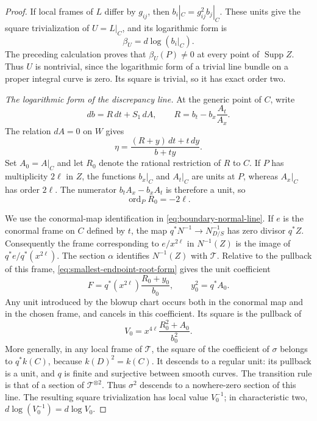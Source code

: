 \begin{proof}
If local frames of $L$ differ by $g_{ij}$, then
$b_i|_C=g_{ij}^2b_j|_C$.  These units give the square trivialization
of $U=L|_C$, and its logarithmic form is
\[
 \beta_U=d\log(b_i|_C).
\]
The preceding calculation proves that $\beta_U(P)\ne0$ at every
point of $\operatorname{Supp}Z$.  Thus $U$ is nontrivial, since the
logarithmic form of a trivial line bundle on a proper integral curve
is zero.  Its square is trivial, so it has exact order two.

\smallskip\noindent
\emph{The logarithmic form of the discrepancy line.}
At the generic point of $C$, write
\[
 db=R\,dt+S_1\,dA,\qquad
 R=b_t-b_x\frac{A_t}{A_x}.
\]
The relation $dA=0$ on $W$ gives
\begin{equation}\label{eq:smallest-endpoint-root-form}
 \eta=\frac{(R+y)\,dt+t\,dy}{b+ty}.
\end{equation}
Set $A_0=A|_C$ and let $R_0$ denote the rational restriction of $R$
to $C$.  If $P$ has multiplicity $2\ell$ in $Z$, the functions
$b_x|_C$ and $A_t|_C$ are units at $P$, whereas $A_x|_C$ has order
$2\ell$.  The numerator $b_tA_x-b_xA_t$ is therefore a unit, so
\[
 \operatorname{ord}_P R_0=-2\ell.
\]

We use the conormal-map identification in
\eqref{eq:boundary-normal-line}.  If $e$ is the conormal frame on
$C$ defined by $t$, the map
$q^*N^{-1}\to N_{D/S}^{-1}$ has zero divisor $q^*Z$.
Consequently the frame corresponding to $e/x^{2\ell}$ in
$N^{-1}(Z)$ is the image of $q^*e/q^*(x^{2\ell})$.
The section $\alpha$ identifies $N^{-1}(Z)$ with $\mathcal T$.
Relative to the pullback of this frame,
\eqref{eq:smallest-endpoint-root-form} gives the unit coefficient
\[
 F=q^*(x^{2\ell})\frac{R_0+y_0}{b_0},
 \qquad y_0^2=q^*A_0.
\]
Any unit introduced by the blowup chart occurs both in the conormal
map and in the chosen frame, and cancels in this coefficient.
Its square is the pullback of
\begin{equation}\label{eq:smallest-endpoint-discrepancy-unit}
 V_0=x^{4\ell}\frac{R_0^2+A_0}{b_0^2}.
\end{equation}
More generally, in any local frame of $\mathcal T$, the square of
the coefficient of $\sigma$ belongs to $q^*k(C)$, because
$k(D)^2=k(C)$.  It descends to a regular unit: its pullback is a
unit, and $q$ is finite and surjective between smooth curves.
The transition rule is that of a section of $\mathcal T^{\otimes2}$.
Thus $\sigma^2$ descends to a nowhere-zero section of this line.
The resulting square trivialization has local value $V_0^{-1}$;
in characteristic two, $d\log(V_0^{-1})=d\log V_0$.


\end{proof}
